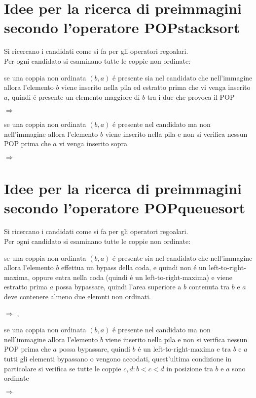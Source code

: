\section*{Idee per la ricerca di preimmagini secondo l'operatore POPstacksort}
Si ricercano i candidati come si fa per gli operatori regoalari.\\
Per ogni candidato si esaminano tutte le coppie non ordinate:
\begin{description}
\item se una coppia non ordinata $(b,a)$ \'e presente sia nel candidato che nell'immagine allora l'elemento $b$ viene inserito nella pila ed estratto prima che vi venga inserito $a$, quindi \'e presente un elemento maggiore di $b$ tra i due che provoca il POP
\begin{center}
 $\Rightarrow$ 
\end{center} \item se una coppia non ordinata $(b,a)$ \'e presente nel candidato ma non nell'immagine allora l'elemento $b$ viene inserito nella pila e non si verifica nessun POP prima che $a$ vi venga inserito sopra
\begin{center}
 $\Rightarrow$ 
\end{center} 
\end{description}
\section*{Idee per la ricerca di preimmagini secondo l'operatore POPqueuesort}
Si ricercano i candidati come si fa per gli operatori regoalari.\\
Per ogni candidato si esaminano tutte le coppie non ordinate:
\begin{description}
\item se una coppia non ordinata $(b,a)$ \'e presente sia nel candidato che nell'immagine allora l'elemento $b$ effettua un bypass della coda, e quindi non \'e un left-to-right-maxima, oppure entra nella coda (quindi \'e un left-to-right-maxima) e viene estratto prima $a$ possa bypassare, quindi l'area superiore a $b$ contenuta tra $b$ e $a$ deve contenere almeno due elemnti non ordinati.
\begin{center}
 $\Rightarrow$
,
\end{center} 
\item se una coppia non ordinata $(b,a)$ \'e presente nel candidato ma non nell'immagine allora l'elemento $b$ viene inserito nella pila e non si verifica nessun POP prima che $a$ possa bypassare, quindi $b$ \'e un left-to-right-maxima e tra $b$ e $a$ tutti gli elementi bypassano o vengono accodati, quest'ultima condizione in particolare si verifica se tutte le coppie $c,d: b<c<d$ in posizione tra $b$ e $a$ sono ordinate
\begin{center}
 $\Rightarrow$
\end{center} 
\end{description}

